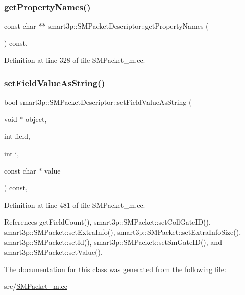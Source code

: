 \subsubsection{\texorpdfstring{get\+Property\+Names()}{getPropertyNames()}}
{\footnotesize\ttfamily const char $\ast$$\ast$ smart3p\+::\+S\+M\+Packet\+Descriptor\+::get\+Property\+Names (\begin{DoxyParamCaption}{ }\end{DoxyParamCaption}) const\hspace{0.3cm}{\ttfamily [override]}, {\ttfamily [virtual]}}



Definition at line 328 of file S\+M\+Packet\+\_\+m.\+cc.

\mbox{\label{classsmart3p_1_1SMPacketDescriptor_a4cdbc988a0825861aba13a2ceb2db877}} 
\subsubsection{\texorpdfstring{set\+Field\+Value\+As\+String()}{setFieldValueAsString()}}
{\footnotesize\ttfamily bool smart3p\+::\+S\+M\+Packet\+Descriptor\+::set\+Field\+Value\+As\+String (\begin{DoxyParamCaption}\item[{void $\ast$}]{object,  }\item[{int}]{field,  }\item[{int}]{i,  }\item[{const char $\ast$}]{value }\end{DoxyParamCaption}) const\hspace{0.3cm}{\ttfamily [override]}, {\ttfamily [virtual]}}



Definition at line 481 of file S\+M\+Packet\+\_\+m.\+cc.



References get\+Field\+Count(), smart3p\+::\+S\+M\+Packet\+::set\+Coll\+Gate\+I\+D(), smart3p\+::\+S\+M\+Packet\+::set\+Extra\+Info(), smart3p\+::\+S\+M\+Packet\+::set\+Extra\+Info\+Size(), smart3p\+::\+S\+M\+Packet\+::set\+Id(), smart3p\+::\+S\+M\+Packet\+::set\+Sm\+Gate\+I\+D(), and smart3p\+::\+S\+M\+Packet\+::set\+Value().



The documentation for this class was generated from the following file\+:\begin{DoxyCompactItemize}
\item 
src/\hyperlink{SMPacket__m_8cc}{S\+M\+Packet\+\_\+m.\+cc}\end{DoxyCompactItemize}
